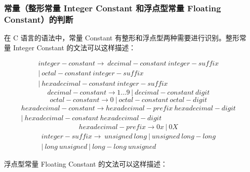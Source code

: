 \documentclass[UTF8]{ctexart}
\begin{document}
\subsubsection{常量（整形常量 Integer Constant 和浮点型常量 Floating Constant）的判断}
在 C 语言的语法中，常量 Constant 有整形和浮点型两种需要进行识别。整形常量 Integer Constant 的文法可以这样描述：

\begin{equation}
  \begin{split}
    integer-constant \rightarrow \ decimal-constant \ integer-suffix\\|\ octal-constant \ integer-suffix\\|\ hexadecimal-constant \ integer-suffix
  \end{split}
\end{equation}
\begin{equation}
  decimal-constant \rightarrow 1...9\ |\ decimal-constant\ digit
\end{equation}
\begin{equation}
  octal-constant \rightarrow 0\ |\ octal-constant\ octal-digit
\end{equation}
\begin{equation}
  \begin{split}
    hexadecimal-constant \rightarrow hexadecimal-prefix\ hexadecimal-digit\\|\ hexadecimal-constant\ hexadecimal-digit
  \end{split}
\end{equation}
\begin{equation}
  hexadecimal-prefix \rightarrow 0x\ |\ 0X
\end{equation}
\begin{equation}
  \begin{split}
    integer-suffix \rightarrow\ unsigned\ long\ |\ unsigned\ long-long\\|\ long\ unsigned\ |\ long-long\ unsigned
  \end{split}
\end{equation}

浮点型常量 Floating Constant 的文法可以这样描述：
\end{document}
